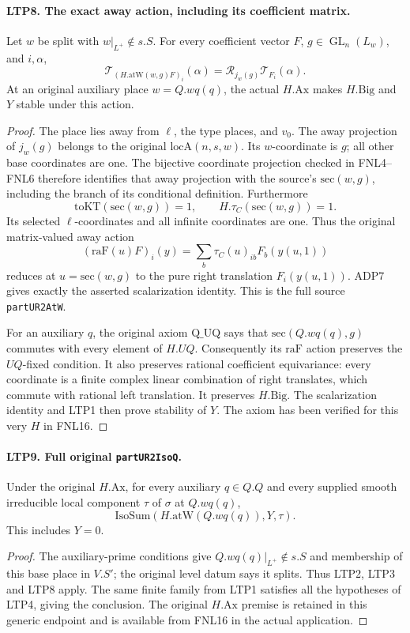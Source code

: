 \paragraph{LTP8. The exact away action, including its coefficient matrix.}
\label{claim:LTP8}
Let \(w\) be split with \(w|_{L^+}\notin s.S\).  For every
coefficient vector \(F\), \(g\in\operatorname{GL}_n(L_w)\),
and \(i,\alpha\),
\[
 \mathcal T_{(H.\mathrm{atW}(w,g)F)_i}(\alpha)
                    =\mathscr R_{j_w(g)}\mathcal T_{F_i}(\alpha).
\]
At an original auxiliary place \(w=Q.wq(q)\), the actual
\(H.\mathrm{Ax}\) makes \(H.\mathrm{Big}\) and \(Y\) stable
under this action.
\begin{proof}
The place lies away from \(\ell\), the type places, and \(v_0\).
The away projection of \(j_w(g)\) belongs to the original
\(\mathrm{locA}(n,s,w)\).  Its \(w\)-coordinate is \(g\);
all other base coordinates are one.  The bijective coordinate
projection checked in FNL4--FNL6 therefore identifies that away
projection with the source's \(\mathrm{sec}(w,g)\), including
the branch of its conditional definition.  Furthermore
\[
 \mathrm{toKT}(\mathrm{sec}(w,g))=1,\qquad
 H.\tau_C(\mathrm{sec}(w,g))=1.
\]
Its selected \(\ell\)-coordinates and all infinite coordinates
are one.  Thus the original matrix-valued away action
\[
  (\mathrm{raF}(u)F)_i(y)
       =\sum_b\tau_C(u)_{ib}F_b(y(u,1))
\]
reduces at \(u=\mathrm{sec}(w,g)\) to the pure right translation
\(F_i(y(u,1))\).  ADP7 gives exactly the asserted scalarization
identity.  This is the full source \texttt{partUR2AtW}.

For an auxiliary \(q\), the original axiom \(\mathrm{Q\_UQ}\)
says that \(\mathrm{sec}(Q.wq(q),g)\) commutes with every element
of \(H.UQ\).  Consequently its \(\mathrm{raF}\) action preserves
the \(UQ\)-fixed condition.  It also preserves rational coefficient
equivariance: every coordinate is a finite complex linear
combination of right translates, which commute with rational
left translation.  It preserves \(H.\mathrm{Big}\).
The scalarization identity and LTP1 then prove stability of \(Y\).
The axiom has been verified for this very \(H\) in FNL16.
\end{proof}

\paragraph{LTP9. Full original \texttt{partUR2IsoQ}.}
\label{claim:LTP9}
Under the original \(H.\mathrm{Ax}\), for every auxiliary
\(q\in Q.Q\) and every supplied smooth irreducible local component
\(\tau\) of \(\sigma\) at \(Q.wq(q)\),
\[
             \mathrm{IsoSum}(H.\mathrm{atW}(Q.wq(q)),Y,\tau).
\]
This includes \(Y=0\).
\begin{proof}
The auxiliary-prime conditions give
\(Q.wq(q)|_{L^+}\notin s.S\) and membership of this base place
in \(V.S'\); the original level datum says it splits.
Thus LTP2, LTP3 and LTP8 apply.  The same finite family from
LTP1 satisfies all the hypotheses of LTP4, giving the conclusion.
The original \(H.\mathrm{Ax}\) premise is retained in this generic
endpoint and is available from FNL16 in the actual application.
\end{proof}

